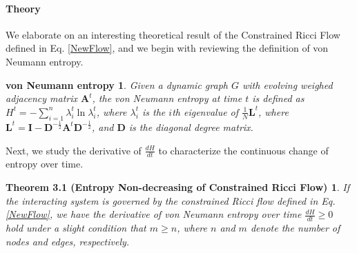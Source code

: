 \paragraph{Theory} 
We elaborate on an interesting theoretical result of the Constrained Ricci Flow defined in Eq. \ref{NewFlow}, and we begin with reviewing the definition of von Neumann entropy.
\newtheorem*{def2}{von Neumann entropy } 
\begin{def2}
Given a dynamic graph $G$ with evolving weighed adjacency  matrix $\boldsymbol A^t$, 
the von Neumann entropy at time $t$ is defined as $ H^t=-\sum_{i=1}^{n} \lambda_i^t \ln\lambda_i^t$, 
where $\lambda^t_i$ is the $i$th eigenvalue of $\frac{1}{N}\boldsymbol{L}^t$, where 
 $\boldsymbol{L}^t= \boldsymbol{I} -{\boldsymbol D}^{-\frac{1}{2}}\boldsymbol A^t {\boldsymbol D}^{-\frac{1}{2}}$, 
and $\boldsymbol D$ is the diagonal degree matrix.
\end{def2}
\noindent Next, we study the derivative of $\frac{dH}{dt}$ to characterize the continuous change of entropy over time.
\newtheorem*{thm1}{Theorem 3.1 (Entropy Non-decreasing of Constrained Ricci Flow)} 
\begin{thm1}
If the interacting system is governed by the constrained Ricci flow defined in Eq. \ref{NewFlow},
we have the derivative of von Neumann entropy over time $\frac{dH}{dt}\ge 0$  hold under a slight condition that $m\ge n$, where $n$ and $m$ denote the number of nodes and edges, respectively. 
\end{thm1}
